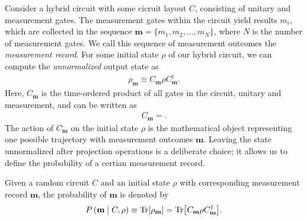 Consider a hybrid circuit with some cicruit layout $C$, consisting of unitary
and measurement gates. The measurement gates within the circuit yield results
$m_i$, which are collected in the sequence $\mathbf{m} = \{m_1, m_2, \ldots,
m_N\}$, where $N$ is the number of measurement gates. We call this sequence of
measurement outcomes the \emph{measurement record}. For some initial state
$\rho$ of our hybrid circuit, we can compute the \emph{unnormalized} output
state as
\begin{align}\label{eq:rho-m}
  \rho_\mathbf{m} \equiv C_\mathbf{m} \rho C^\dagger_\mathbf{m}
.\end{align}
Here, $C_\mathbf{m}$ is the time-ordered product of all gates in the circuit,
unitary and measurement, and can be written as
\begin{align}
  C_\mathbf{m} = 
.\end{align}
The action of $C_\mathbf{m}$ on the initial state
$\rho$ is the mathematical object representing one possible trajectory with
measurement outcomes $\mathbf{m}$. Leaving the state unnormalized after 
projection operations is a deliberate choice; it allows us to define the
probability of a certian measurement record.

\begin{defn}\label{defn:prob-traj}
  Given a random circuit $C$ and an initial state $\rho$ with corresponding
  measurement record $\mathbf{m}$, the probability of $\mathbf{m}$ is denoted
  by
  \begin{align}
    P\left( \mathbf{m} \mid C, \rho \right) \equiv \Tr[\rho_\mathbf{m}] =
    \Tr[C_\mathbf{m} \rho C^\dagger_\mathbf{m}]
  .\end{align}
\end{defn}

